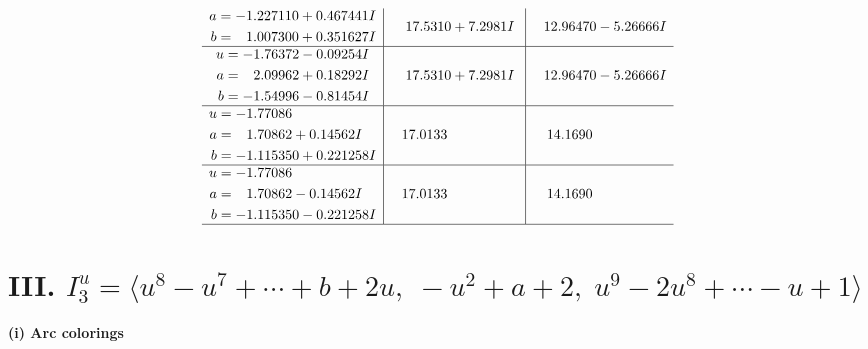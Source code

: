 \documentclass[1p]{elsarticle_modified}
\theoremstyle{definition}
\begin{document}
$$\begin{array}{c|c|c}
\begin{aligned}
a &= -1.227110 + 0.467441 I \\
b &= \phantom{-}1.007300 + 0.351627 I\end{aligned}
 & \phantom{-}17.5310 + 7.2981 I & \phantom{-}12.96470 - 5.26666 I \\ \hline\begin{aligned}
u &= -1.76372 - 0.09254 I \\
a &= \phantom{-}2.09962 + 0.18292 I \\
b &= -1.54996 - 0.81454 I\end{aligned}
 & \phantom{-}17.5310 + 7.2981 I & \phantom{-}12.96470 - 5.26666 I \\ \hline\begin{aligned}
u &= -1.77086\phantom{ +0.000000I} \\
a &= \phantom{-}1.70862 + 0.14562 I \\
b &= -1.115350 + 0.221258 I\end{aligned}
 & \phantom{-}17.0133\phantom{ +0.000000I} & \phantom{-}14.1690\phantom{ +0.000000I} \\ \hline\begin{aligned}
u &= -1.77086\phantom{ +0.000000I} \\
a &= \phantom{-}1.70862 - 0.14562 I \\
b &= -1.115350 - 0.221258 I\end{aligned}
 & \phantom{-}17.0133\phantom{ +0.000000I} & \phantom{-}14.1690\phantom{ +0.000000I}\\
 \hline 
 \end{array}$$\newpage\newpage\renewcommand{\arraystretch}{1}
\centering \section*{III. $I^u_{3}= \langle u^8- u^7+\cdots+b+2 u,\;- u^2+a+2,\;u^9-2 u^8+\cdots- u+1 \rangle$}
\flushleft \textbf{(i) Arc colorings}\\
\end{document}

